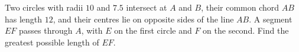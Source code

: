 Two circles with radii $10$ and $7.5$ intersect at $A$ and $B$, their common chord $AB$ has length $12$, and their centres lie on opposite sides of the line $AB$. A segment $EF$ passes through $A$, with $E$ on the first circle and $F$ on the second. Find the greatest possible length of $EF$.
